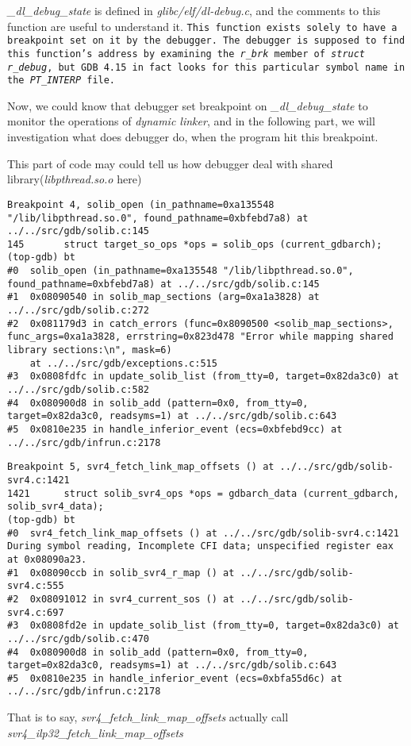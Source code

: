 \documentclass[12pt]{book}
\begin{document}
\begin{CJK}{UTF8}{gbsn}
\emph{\_dl\_debug\_state} is defined in \emph{glibc/elf/dl-debug.c}, and the comments
to this function are useful to understand it.  \texttt{This function exists solely to have a 
breakpoint set on it by the debugger.  The debugger is supposed to find this function's 
address by examining the \emph{r\_brk} member of \emph{struct r\_debug}, but GDB 4.15 in fact looks
for this particular symbol name in the \emph{PT\_INTERP} file.}


Now, we could know that debugger set breakpoint on \emph{\_dl\_debug\_state} to monitor the operations
of \emph{dynamic linker}, and in the following part, we will investigation what does debugger do, when
the program hit this breakpoint.


This part of code may could tell us how debugger deal with shared library(\emph{libpthread.so.o} here)
\begin{verbatim}
Breakpoint 4, solib_open (in_pathname=0xa135548 "/lib/libpthread.so.0", found_pathname=0xbfebd7a8) at ../../src/gdb/solib.c:145
145       struct target_so_ops *ops = solib_ops (current_gdbarch);
(top-gdb) bt
#0  solib_open (in_pathname=0xa135548 "/lib/libpthread.so.0", found_pathname=0xbfebd7a8) at ../../src/gdb/solib.c:145
#1  0x08090540 in solib_map_sections (arg=0xa1a3828) at ../../src/gdb/solib.c:272
#2  0x081179d3 in catch_errors (func=0x8090500 <solib_map_sections>, func_args=0xa1a3828, errstring=0x823d478 "Error while mapping shared library sections:\n", mask=6)
    at ../../src/gdb/exceptions.c:515
#3  0x0808fdfc in update_solib_list (from_tty=0, target=0x82da3c0) at ../../src/gdb/solib.c:582
#4  0x080900d8 in solib_add (pattern=0x0, from_tty=0, target=0x82da3c0, readsyms=1) at ../../src/gdb/solib.c:643
#5  0x0810e235 in handle_inferior_event (ecs=0xbfebd9cc) at ../../src/gdb/infrun.c:2178
\end{verbatim}

\begin{verbatim}
Breakpoint 5, svr4_fetch_link_map_offsets () at ../../src/gdb/solib-svr4.c:1421
1421      struct solib_svr4_ops *ops = gdbarch_data (current_gdbarch, solib_svr4_data);
(top-gdb) bt
#0  svr4_fetch_link_map_offsets () at ../../src/gdb/solib-svr4.c:1421
During symbol reading, Incomplete CFI data; unspecified register eax at 0x08090a23.
#1  0x08090ccb in solib_svr4_r_map () at ../../src/gdb/solib-svr4.c:555
#2  0x08091012 in svr4_current_sos () at ../../src/gdb/solib-svr4.c:697
#3  0x0808fd2e in update_solib_list (from_tty=0, target=0x82da3c0) at ../../src/gdb/solib.c:470
#4  0x080900d8 in solib_add (pattern=0x0, from_tty=0, target=0x82da3c0, readsyms=1) at ../../src/gdb/solib.c:643
#5  0x0810e235 in handle_inferior_event (ecs=0xbfa55d6c) at ../../src/gdb/infrun.c:2178
\end{verbatim}
That is to say, \emph{svr4\_fetch\_link\_map\_offsets} actually call \emph{svr4\_ilp32\_fetch\_link\_map\_offsets}



\end{CJK}
\end{document}
